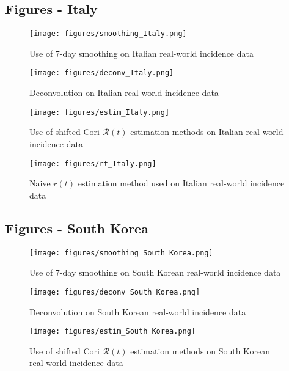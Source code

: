 \documentclass{article}
\newcommand{\nR}{\mathscr{R}}
\newcommand{\nr}{r}
\begin{document}
\clearpage
\subsection{Figures - Italy}
\begin{figure}[h!]
    \centering
    \texttt{[image: figures/smoothing\_Italy.png]}
    \caption{Use of 7-day smoothing on Italian real-world incidence data}
    \label{fig:my_label}
\end{figure}

\begin{figure}
    \centering
    \texttt{[image: figures/deconv\_Italy.png]}
    \caption{Deconvolution on Italian real-world incidence data}
    \label{fig:my_label}
\end{figure}

\begin{figure}[h!]
    \centering
    \texttt{[image: figures/estim\_Italy.png]}
    \caption{Use of shifted Cori $\nR(t)$ estimation methods on Italian real-world incidence data}
    \label{fig:my_label}
\end{figure}

\clearpage
\begin{figure}[h!]
    \centering
    \texttt{[image: figures/rt\_Italy.png]}
    \caption{Naive $\nr(t)$ estimation method used on Italian real-world incidence data}
    \label{fig:my_label}
\end{figure}

\clearpage
\subsection{Figures - South Korea}
\begin{figure}[h!]
    \centering
    \texttt{[image: figures/smoothing\_South Korea.png]}
    \caption{Use of 7-day smoothing on South Korean real-world incidence data}
    \label{fig:my_label}
\end{figure}

\begin{figure}
    \centering
    \texttt{[image: figures/deconv\_South Korea.png]}
    \caption{Deconvolution on South Korean real-world incidence data}
    \label{fig:my_label}
\end{figure}

\begin{figure}[h!]
    \centering
    \texttt{[image: figures/estim\_South Korea.png]}
    \caption{Use of shifted Cori $\nR(t)$ estimation methods on South Korean real-world incidence data}
    \label{fig:my_label}
\end{figure}
\end{document}

